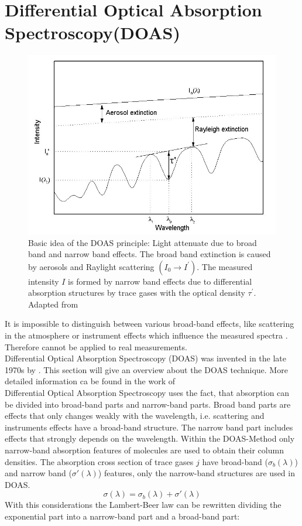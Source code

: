 \documentclass  [
  paper    = a4,
  BCOR     = 10mm,
  twoside,
  fontsize = 12pt,
  fleqn,
  toc      = bibnumbered,
  toc      = listofnumbered,
  numbers  = noendperiod,
  headings = normal,
  listof   = leveldown,
  version  = 3.03
]                                       {scrreprt}
\begin{document}
	\section{Differential Optical Absorption Spectroscopy(DOAS)\label{DOAS}}
		\begin{figure}
			\centering
			\includegraphics[width=0.7\linewidth]{Bilder/Simon/Bilder_Tung/DOAS_Intensity}
			\caption{Basic idea of the DOAS principle: Light attenuate due to broad band and narrow band effects. The broad band extinction is caused by aerosols and Raylight scattering $\left(I_0\rightarrow I^{'}\right)$. The measured intensity $I$ is formed by narrow band effects due to differential absorption structures by trace gases with the optical density $\tau^{'}$. Adapted from \cite{kern2009spectroscopic}}
			\label{fig:doasintensity}
		\end{figure}
		
	It is impossible to distinguish between various broad-band effects, like scattering in the atmosphere or instrument effects which influence the measured spectra \citep{lubcke2014optical}. Therefore  cannot be applied to real measurements.\\
	Differential Optical Absorption Spectroscopy (DOAS) was invented in the late 1970s by \cite{perner1979detection}. This section will give an overview about the DOAS technique. More detailed information ca be found in the work of \cite{platt2008differential}\\
	\newline
	Differential Optical Absorption Spectroscopy uses the fact, that absorption can be divided into broad-band parts and narrow-band parts. Broad band parts are effects that only changes weakly with the wavelength,  i.e. scattering and instruments effects have a broad-band structure. 
	The narrow band part includes effects that strongly depends on the wavelength.
	Within the DOAS-Method only narrow-band absorption features of molecules are used to obtain their column densities.
	The absorption cross section of trace gases $j$ have broad-band ($\sigma_b\left(\lambda \right)$) and narrow band ($\sigma{'}\left(\lambda \right)$) features, only the narrow-band structures are used in DOAS.
	\begin{equation}
	\sigma\left(\lambda \right) = \sigma_b\left(\lambda \right) + \sigma{'}\left(\lambda \right)
	\end{equation}
	With this considerations the Lambert-Beer law  can be rewritten
	dividing the exponential part into a narrow-band part and a broad-band part:
\end{document}
